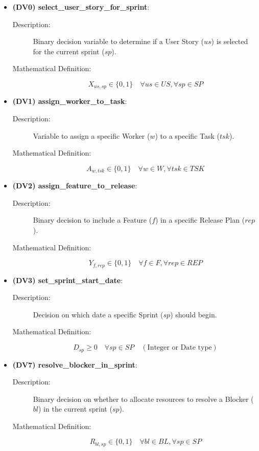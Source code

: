 \documentclass[11pt]{article}
\begin{document}
\begin{itemize}
    \item \textbf{(DV0) select\_user\_story\_for\_sprint}:
    \begin{description}
        \item[Description:] Binary decision variable to determine if a User Story ($us$) is selected for the current sprint ($sp$).
        \item[Mathematical Definition:]
        $$ X_{us, sp} \in \{0, 1\} \quad \forall us \in US, \forall sp \in SP $$
    \end{description}

    \item \textbf{(DV1) assign\_worker\_to\_task}:
    \begin{description}
        \item[Description:] Variable to assign a specific Worker ($w$) to a specific Task ($tsk$).
        \item[Mathematical Definition:]
        $$ A_{w, tsk} \in \{0, 1\} \quad \forall w \in W, \forall tsk \in TSK $$
    \end{description}
    
    \item \textbf{(DV2) assign\_feature\_to\_release}:
    \begin{description}
        \item[Description:] Binary decision to include a Feature ($f$) in a specific Release Plan ($rep$).
        \item[Mathematical Definition:]
        $$ Y_{f, rep} \in \{0, 1\} \quad \forall f \in F, \forall rep \in REP $$
    \end{description}

    \item \textbf{(DV3) set\_sprint\_start\_date}:
    \begin{description}
        \item[Description:] Decision on which date a specific Sprint ($sp$) should begin.
        \item[Mathematical Definition:]
        $$ D_{sp} \ge 0 \quad \forall sp \in SP \quad (\text{Integer or Date type}) $$
    \end{description}

    \item \textbf{(DV7) resolve\_blocker\_in\_sprint}:
    \begin{description}
        \item[Description:] Binary decision on whether to allocate resources to resolve a Blocker ($bl$) in the current sprint ($sp$).
        \item[Mathematical Definition:]
        $$ R_{bl, sp} \in \{0, 1\} \quad \forall bl \in BL, \forall sp \in SP $$
    \end{description}
\end{itemize}
\end{document}
